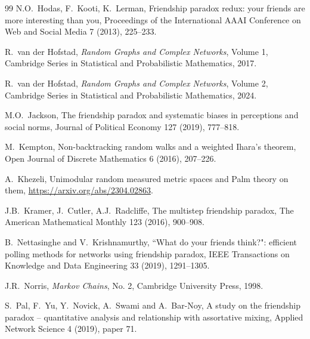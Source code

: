 \documentclass[11pt]{article}
\numberwithin{equation}{section}
\theoremstyle{plain}
\begin{document}
\begin{thebibliography}{99}
N.O.\ Hodas, F.\ Kooti, K.\ Lerman,
Friendship paradox redux: your friends are more interesting than you,
Proceedings of the International AAAI Conference on Web and Social Media 7 (2013), 225--233.

R.\ van der Hofstad,
\textit{Random Graphs and Complex Networks}, Volume 1, 
Cambridge Series in Statistical and Probabilistic Mathematics, 2017.

R.\ van der Hofstad,
\textit{Random Graphs and Complex Networks}, Volume 2,
Cambridge Series in Statistical and Probabilistic Mathematics, 2024. 

M.O.\ Jackson, 
The friendship paradox and systematic biases in perceptions and social norms, 
Journal of Political Economy 127 (2019), 777--818.

M.\ Kempton,
Non-backtracking random walks and a weighted Ihara's theorem, 
Open Journal of Discrete Mathematics 6 (2016), 207--226.

A.\ Khezeli,
Unimodular random measured metric spaces and Palm theory on them,
\url{https://arxiv.org/abs/2304.02863}.

J.B.\ Kramer, J.\ Cutler, A.J.\ Radcliffe,  
The multistep friendship paradox, 
The American Mathematical Monthly 123 (2016), 900--908.

B.\ Nettasinghe and V.\ Krishnamurthy, 
``What do your friends think?": efficient polling methods for networks using friendship paradox,
IEEE Transactions on Knowledge and Data Engineering 33 (2019), 1291--1305.

J.R.\ Norris,
\textit{Markov Chains}, No. 2,
Cambridge University Press, 1998.

S.\ Pal, F.\ Yu, Y.\ Novick, A.\ Swami and A.\ Bar-Noy,
A study on the friendship paradox -- quantitative analysis and relationship with assortative mixing,
Applied Network Science 4 (2019), paper 71.

\end{thebibliography}

\end{document}
